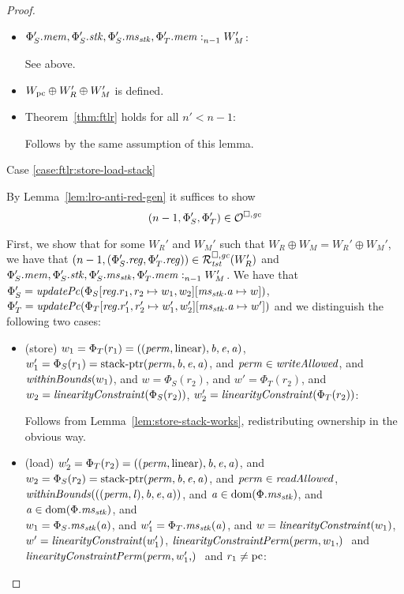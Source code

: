 \begin{proof}
\begin{itemize}
  \item $\memSat[n-1]{\Phi_S'.\mem,\Phi_S'.\stk,\Phi_S'.\ms_\stk,\Phi_T'.\mem}{W_M'}$:

    See above.

  \item $W_\pcreg \oplus W_R' \oplus W_M'$ is defined.

  \item Theorem~\ref{thm:ftlr} holds for all $n' < n-1$:

    Follows by the same assumption of this lemma.
  \end{itemize}

  Case \ref{case:ftlr:store-load-stack}

  By Lemma~\ref{lem:lro-anti-red-gen} it suffices to show
  \[
    \npair[n-1]{\Phi_S',\Phi_T'} \in \lro
  \]

  First, we show that for some $W_R'$ and $W_M'$ such that $W_R \oplus W_M = W_R' \oplus W_M'$, we have that $\npair[n-1]{(\Phi_S'.\reg,\Phi_T'.\reg)} \in \lrrg{\trust}(W_R')$ and $\memSat[n-1]{\Phi_S'.\mem,\Phi_S'.\stk,\Phi_S'.\ms_\stk,\Phi_T'.\mem}{W_M'}$.
  We have that $\Phi_S' = \updPcAddr{\Phi_S\updReg{r_1,r_2}{w_1,w_2}\update{\ms_\stk.\aaddr}{w}}$, $\Phi_T' = \updPcAddr{\Phi_T\updReg{r_1',r_2'}{w_1',w_2'}\update{\ms_\stk.\aaddr}{w'}}$ and we distinguish the following two cases:
  \begin{itemize}
  \item (store) $w_1 = \Phi_T(r_1) =
        ((\perm,\linear),\baddr,\eaddr,\aaddr)$, $w_1' = \Phi_S(r_1) =
        \stkptr{\perm,\baddr,\eaddr,\aaddr}$, and $\perm \in \writeAllowed{}$, and $\withinBounds{w_1}$, and $w = \Phi_S(r_2)$, and $w' = \Phi_T(r_2)$, and $w_2 = \linCons{\Phi_S(r_2)}$, $w_2' = \linCons{\Phi_T(r_2)}$:

        Follows from Lemma~\ref{lem:store-stack-works}, redistributing ownership in the obvious way.

  \item (load) $ w_2' = \Phi_T(r_2) =
        ((\perm,\linear),\baddr,\eaddr,\aaddr)$, and $w_2 = \Phi_S(r_2) =
        \stkptr{\perm,\baddr,\eaddr,\aaddr}$, and $\perm \in \readAllowed{}$,
        $\withinBounds{((\perm,\lin),\baddr,\eaddr,\aaddr)}$, and $\aaddr \in
        \dom(\Phi.\ms_\stk)$, and $\aaddr \in \dom(\Phi.\ms_\stk)$, and\\
        $w_1 = \Phi_S.\ms_\stk(\aaddr)$, and $w_1' = \Phi_T.\ms_\stk(\aaddr)$, and $w = \linCons{w_1}$, $w' = \linCons{w_1'}$, $\linConsPerm{\perm,w_1}$ and $\linConsPerm{\perm,w_1'}$ and $r_1 \neq \pcreg$:


\end{itemize}
\end{proof}
